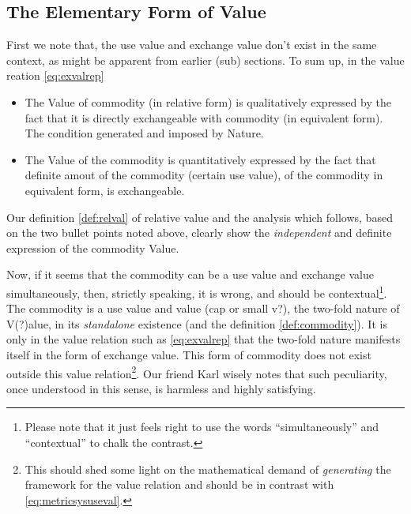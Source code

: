 \documentclass[12pt]{extarticle}
\theoremstyle{definition}
\begin{document}
\subsection{The Elementary Form of Value}
\label{sec:elemformval}
First we note that, the use value and exchange value don't exist in the same context, as might be apparent from earlier (sub) sections.  To sum up, in the value reation \ref{eq:exvalrep} 
\begin{itemize}
\item The Value of commodity (in relative form) is qualitatively expressed by the fact that it is directly exchangeable with commodity (in equivalent form).  The condition generated and imposed by Nature.
  \item The Value of the commodity is quantitatively expressed by the fact that definite amout of the commodity (certain use value), of the commodity in equivalent form, is exchangeable.
  \end{itemize}

  Our definition \ref{def:relval} of relative value and the analysis which follows, based on the two bullet points noted above, clearly show the \emph{independent} and definite expression of the commodity Value.

  Now, if it seems that the commodity can be a use value and exchange value simultaneously, then, strictly speaking, it is wrong, and should be contextual\footnote{Please note that it just feels right to use the words ``simultaneously'' and ``contextual'' to chalk the contrast.}.  The commodity is a use value and value (cap or small v?), the two-fold nature of V(?)alue, in its \emph{standalone} existence (and the definition \ref{def:commodity}).  It is only in the value relation such as \ref{eq:exvalrep} that the two-fold nature manifests itself in the form of exchange value.  This form of commodity does not exist outside this value relation\footnote{This should shed some light on the mathematical demand of \emph{generating} the framework for the value relation and should be in contrast with \ref{eq:metricsysuseval}.}.  Our friend Karl wisely notes that such peculiarity, once understood in this sense, is harmless and highly satisfying.



\end{document}
